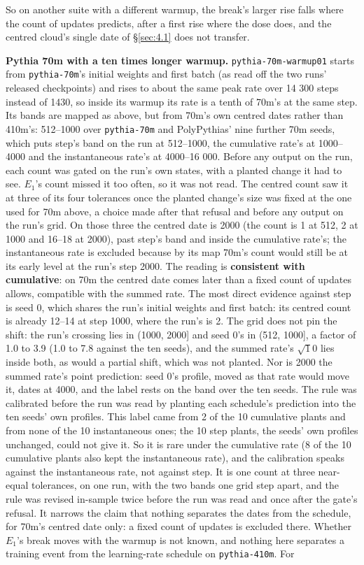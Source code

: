 \documentclass[11pt]{article}
\begin{document}
So on another suite with a different warmup, the break's larger rise falls where the count of updates predicts, after a first rise where the dose does, and the centred cloud's single date of \S\ref{sec:4.1} does not transfer.

\textbf{Pythia 70m with a ten times longer warmup.} \texttt{pythia-70m-warmup01} \citep{belrose2024} starts from \texttt{pythia-70m}'s initial weights and first batch (as read off the two runs' released checkpoints) and rises to about the same peak rate over 14 300 steps instead of 1430, so inside its warmup its rate is a tenth of 70m's at the same step. Its bands are mapped as above, but from 70m's own centred dates rather than 410m's: 512--1000 over \texttt{pythia-70m} and PolyPythias' nine further 70m seeds, which puts step's band on the run at 512--1000, the cumulative rate's at 1000--4000 and the instantaneous rate's at 4000--16 000. Before any output on the run, each count was gated on the run's own states, with a planted change it had to see. $E_{1}$'s count missed it too often, so it was not read. The centred count saw it at three of its four tolerances once the planted change's size was fixed at the one used for 70m above, a choice made after that refusal and before any output on the run's grid. On those three the centred date is 2000 (the count is 1 at 512, 2 at 1000 and 16--18 at 2000), past step's band and inside the cumulative rate's; the instantaneous rate is excluded because by its map 70m's count would still be at its early level at the run's step 2000. The reading is \textbf{consistent with cumulative}: on 70m the centred date comes later than a fixed count of updates allows, compatible with the summed rate. The most direct evidence against step is seed 0, which shares the run's initial weights and first batch: its centred count is already 12--14 at step 1000, where the run's is 2. The grid does not pin the shift: the run's crossing lies in (1000, 2000] and seed 0's in (512, 1000], a factor of 1.0 to 3.9 (1.0 to 7.8 against the ten seeds), and the summed rate's $\surd 10$ lies inside both, as would a partial shift, which was not planted. Nor is 2000 the summed rate's point prediction: seed 0's profile, moved as that rate would move it, dates at 4000, and the label rests on the band over the ten seeds. The rule was calibrated before the run was read by planting each schedule's prediction into the ten seeds' own profiles. This label came from 2 of the 10 cumulative plants and from none of the 10 instantaneous ones; the 10 step plants, the seeds' own profiles unchanged, could not give it. So it is rare under the cumulative rate (8 of the 10 cumulative plants also kept the instantaneous rate), and the calibration speaks against the instantaneous rate, not against step. It is one count at three near-equal tolerances, on one run, with the two bands one grid step apart, and the rule was revised in-sample twice before the run was read and once after the gate's refusal. It narrows the claim that nothing separates the dates from the schedule, for 70m's centred date only: a fixed count of updates is excluded there. Whether $E_{1}$'s break moves with the warmup is not known, and nothing here separates a training event from the learning-rate schedule on \texttt{pythia-410m}. For 
\end{document}
